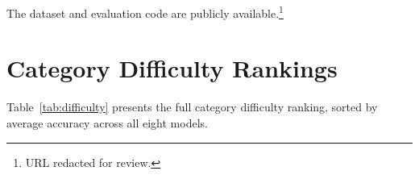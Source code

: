 \documentclass[11pt]{article}
\begin{document}
The dataset and evaluation code are publicly available.\footnote{URL redacted for review.}




\appendix
\section{Category Difficulty Rankings}
\label{app:difficulty}

Table~\ref{tab:difficulty} presents the full category difficulty ranking, sorted by average accuracy across all eight models.
\end{document}
